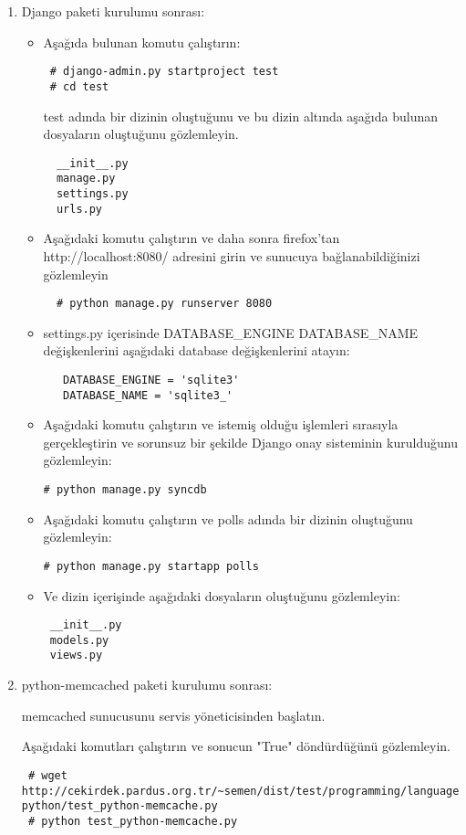 \documentclass[a4paper,10pt]{article}
\begin{document}
\begin{enumerate}
 \item Django paketi kurulumu sonrası:
\begin{itemize}
 \item Aşağıda bulunan komutu çalıştırın:
 \begin{verbatim}
 # django-admin.py startproject test
 # cd test
 \end{verbatim}
 test adında bir dizinin oluştuğunu ve bu dizin altında aşağıda bulunan dosyaların oluştuğunu gözlemleyin.
  \begin{verbatim}
  __init__.py
  manage.py
  settings.py
  urls.py 
  \end{verbatim}
 \item Aşağıdaki komutu çalıştırın ve daha sonra firefox'tan http://localhost:8080/ adresini girin ve sunucuya bağlanabildiğinizi gözlemleyin
  \begin{verbatim}
  # python manage.py runserver 8080
  \end{verbatim}
 \item settings.py içerisinde DATABASE\_ENGINE DATABASE\_NAME değişkenlerini aşağıdaki database değişkenlerini atayın:
  \begin{verbatim}
   DATABASE_ENGINE = 'sqlite3'
   DATABASE_NAME = 'sqlite3_'   
  \end{verbatim}
\item Aşağıdaki komutu çalıştırın ve istemiş olduğu işlemleri sırasıyla gerçekleştirin ve sorunsuz bir şekilde Django onay sisteminin kurulduğunu gözlemleyin:
\begin{verbatim}
# python manage.py syncdb 
\end{verbatim}
\item Aşağıdaki komutu çalıştırın ve polls adında bir dizinin oluştuğunu gözlemleyin:
\begin{verbatim}
# python manage.py startapp polls 
\end{verbatim}
\item Ve dizin içerişinde aşağıdaki dosyaların oluştuğunu gözlemleyin:
\begin{verbatim}
 __init__.py
 models.py
 views.py
\end{verbatim}

\end{itemize}

\item python-memcached paketi kurulumu sonrası:

memcached sunucusunu servis yöneticisinden başlatın.

Aşağıdaki komutları çalıştırın ve sonucun "True" döndürdüğünü gözlemleyin.
\begin{verbatim}
 # wget http://cekirdek.pardus.org.tr/~semen/dist/test/programming/language/
python/test_python-memcache.py
 # python test_python-memcache.py
\end{verbatim}


\end{enumerate}
\end{document}
